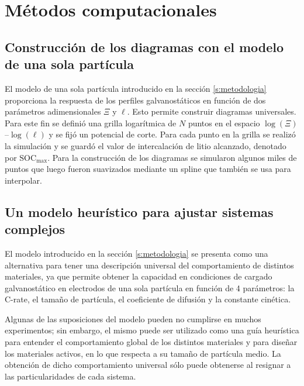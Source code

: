 \section{Métodos computacionales}

\subsection{Construcción de los diagramas con el modelo de una sola partícula}

El modelo de una sola partícula introducido en la sección \ref{s:metodologia}
proporciona la respuesta de los perfiles galvanostáticos en función de dos parámetros
adimensionales $\Xi$ y $\ell$. Esto permite construir diagramas universales. Para 
este fin se definió una grilla logarítmica de $N$ puntos en el espacio 
$\log(\Xi)$--$\log(\ell)$ y se fijó un potencial de corte. Para cada punto en la 
grilla se realizó la simulación y se guardó el valor de intercalación de litio
alcanzado, denotado por $\text{SOC}_{\max}$. Para la construcción de los diagramas 
se simularon algunos miles de puntos que luego fueron suavizados mediante un spline
que también se usa para interpolar.


\subsection{Un modelo heurístico para ajustar sistemas complejos}

El modelo introducido en la sección \ref{s:metodologia} 
se presenta como una alternativa para tener una descripción universal del 
comportamiento de distintos materiales, ya que permite obtener la capacidad en 
condiciones de cargado galvanostático en electrodos de una sola partícula en 
función de 4 parámetros: la C-rate, el tamaño de partícula, el coeficiente de 
difusión y la constante cinética.

Algunas de las suposiciones del modelo pueden no cumplirse en muchos experimentos; sin embargo, el 
mismo puede ser utilizado como una guía heurística para entender el 
comportamiento global de los distintos materiales y para diseñar los materiales
activos, en lo que respecta a su tamaño de partícula medio. La obtención de dicho
comportamiento universal sólo puede obtenerse al resignar a las particularidades
de cada sistema. 

